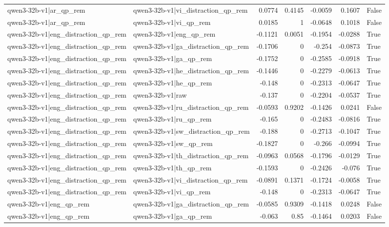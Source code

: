 \begin{table}
\begin{tabular}{l l r r r r l}
qwen3-32b-v1|ar_qp_rem & qwen3-32b-v1|vi_distraction_qp_rem & 0.0774 & 0.4145 & -0.0059 & 0.1607 & False \\
qwen3-32b-v1|ar_qp_rem & qwen3-32b-v1|vi_qp_rem & 0.0185 & 1 & -0.0648 & 0.1018 & False \\
qwen3-32b-v1|eng_distraction_qp_rem & qwen3-32b-v1|eng_qp_rem & -0.1121 & 0.0051 & -0.1954 & -0.0288 & True \\
qwen3-32b-v1|eng_distraction_qp_rem & qwen3-32b-v1|ga_distraction_qp_rem & -0.1706 & 0 & -0.254 & -0.0873 & True \\
qwen3-32b-v1|eng_distraction_qp_rem & qwen3-32b-v1|ga_qp_rem & -0.1752 & 0 & -0.2585 & -0.0918 & True \\
qwen3-32b-v1|eng_distraction_qp_rem & qwen3-32b-v1|he_distraction_qp_rem & -0.1446 & 0 & -0.2279 & -0.0613 & True \\
qwen3-32b-v1|eng_distraction_qp_rem & qwen3-32b-v1|he_qp_rem & -0.148 & 0 & -0.2313 & -0.0647 & True \\
qwen3-32b-v1|eng_distraction_qp_rem & qwen3-32b-v1|raw & -0.137 & 0 & -0.2204 & -0.0537 & True \\
qwen3-32b-v1|eng_distraction_qp_rem & qwen3-32b-v1|ru_distraction_qp_rem & -0.0593 & 0.9202 & -0.1426 & 0.0241 & False \\
qwen3-32b-v1|eng_distraction_qp_rem & qwen3-32b-v1|ru_qp_rem & -0.165 & 0 & -0.2483 & -0.0816 & True \\
qwen3-32b-v1|eng_distraction_qp_rem & qwen3-32b-v1|sw_distraction_qp_rem & -0.188 & 0 & -0.2713 & -0.1047 & True \\
qwen3-32b-v1|eng_distraction_qp_rem & qwen3-32b-v1|sw_qp_rem & -0.1827 & 0 & -0.266 & -0.0994 & True \\
qwen3-32b-v1|eng_distraction_qp_rem & qwen3-32b-v1|th_distraction_qp_rem & -0.0963 & 0.0568 & -0.1796 & -0.0129 & True \\
qwen3-32b-v1|eng_distraction_qp_rem & qwen3-32b-v1|th_qp_rem & -0.1593 & 0 & -0.2426 & -0.076 & True \\
qwen3-32b-v1|eng_distraction_qp_rem & qwen3-32b-v1|vi_distraction_qp_rem & -0.0891 & 0.1371 & -0.1724 & -0.0058 & True \\
qwen3-32b-v1|eng_distraction_qp_rem & qwen3-32b-v1|vi_qp_rem & -0.148 & 0 & -0.2313 & -0.0647 & True \\
qwen3-32b-v1|eng_qp_rem & qwen3-32b-v1|ga_distraction_qp_rem & -0.0585 & 0.9309 & -0.1418 & 0.0248 & False \\
qwen3-32b-v1|eng_qp_rem & qwen3-32b-v1|ga_qp_rem & -0.063 & 0.85 & -0.1464 & 0.0203 & False \\

\end{tabular}
\end{table}
